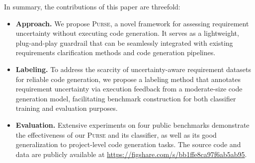 






In summary, the contributions of this paper are threefold:
\begin{itemize}[leftmargin=1em]

    \item \textbf{Approach.} We propose \textsc{Purse}, a novel framework for assessing requirement uncertainty without executing code generation. It serves as a lightweight, plug-and-play guardrail that can be seamlessly integrated with existing requirements clarification methods and code generation pipelines.
    
    \item \textbf{Labeling.} To address the scarcity of uncertainty-aware requirement datasets for reliable code generation, we propose a labeling method that annotates requirement uncertainty via execution feedback from a moderate-size code generation model, facilitating benchmark construction for both  classifier training and evaluation purposes.

    \item \textbf{Evaluation.} Extensive experiments on four public benchmarks demonstrate the effectiveness of our \textsc{Purse} and its classifier, as well as its good generalization to project-level code generation tasks. The source code and data are publicly available at  \url{https://figshare.com/s/bb1ffe8ca97f6ab5ab95}.
\end{itemize}

